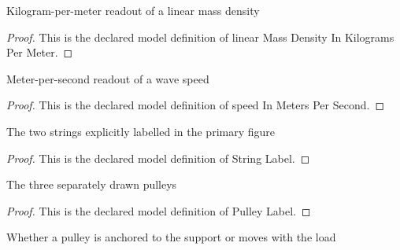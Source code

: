 \begin{definition}
  \label{def:physics:phyx-mini-0292:phyxminiproblems-problemphyxmini0292-linearmassdensityinkilogramspermeter}
  Kilogram-per-meter readout of a linear mass density
\end{definition}
\begin{proof}
  This is the declared model definition of linear Mass Density In Kilograms Per Meter.
\end{proof}
\begin{definition}
  \label{def:physics:phyx-mini-0292:phyxminiproblems-problemphyxmini0292-speedinmeterspersecond}
  Meter-per-second readout of a wave speed
\end{definition}
\begin{proof}
  This is the declared model definition of speed In Meters Per Second.
\end{proof}
\begin{definition}
  \label{def:physics:phyx-mini-0292:phyxminiproblems-problemphyxmini0292-stringlabel}
  The two strings explicitly labelled in the primary figure
\end{definition}
\begin{proof}
  This is the declared model definition of String Label.
\end{proof}
\begin{definition}
  \label{def:physics:phyx-mini-0292:phyxminiproblems-problemphyxmini0292-pulleylabel}
  The three separately drawn pulleys
\end{definition}
\begin{proof}
  This is the declared model definition of Pulley Label.
\end{proof}
\begin{definition}
  \label{def:physics:phyx-mini-0292:phyxminiproblems-problemphyxmini0292-pulleymounting}
  Whether a pulley is anchored to the support or moves with the load
\end{definition}
